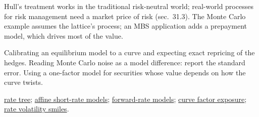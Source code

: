 \begin{qfmodel}
 Hull's treatment works in the traditional risk-neutral world; real-world processes for risk management need a market price of risk (sec.~31.3). The Monte Carlo example assumes the lattice's process; an MBS application adds a prepayment model, which drives most of the value.

 Calibrating an equilibrium model to a curve and expecting exact repricing of the hedges. Reading Monte Carlo noise as a model difference: report the standard error. Using a one-factor model for securities whose value depends on how the curve twists.

 \hyperref[meth:binomial-rate-tree-calibration]{rate tree}; \hyperref[mod:affine-short-rate-models]{affine short-rate models}; \hyperref[mod:hjm-forward-rate-models]{forward-rate models}; \hyperref[meth:yield-curve-factor-exposures]{curve factor exposure}; \hyperref[mod:sabr-smile]{rate volatility smiles}.

\end{qfmodel}

